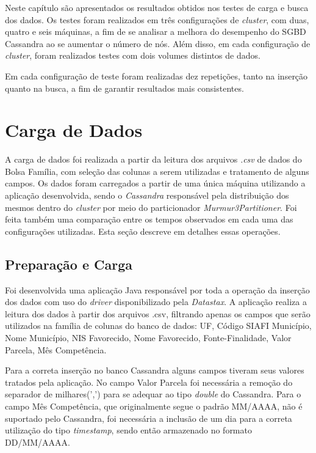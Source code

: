 Neste capítulo são apresentados os resultados obtidos nos testes de carga e busca dos dados. Os testes foram realizados em três configurações de \emph{cluster}, com duas, quatro e seis máquinas, a fim de se analisar a melhora do desempenho do SGBD Cassandra ao se aumentar o número de nós. Além disso, em cada configuração de \emph{cluster}, foram realizados testes com dois volumes distintos de dados.

Em cada configuração de teste foram realizadas dez repetições, tanto na inserção quanto na busca, a fim de garantir resultados mais consistentes. 

\section{Carga de Dados}
A carga de dados foi realizada a partir da leitura dos arquivos \emph{.csv} de dados do Bolsa Família, com seleção das colunas a serem utilizadas e tratamento de alguns campos.
Os dados foram carregados a partir de uma única máquina utilizando a aplicação desenvolvida, sendo o \emph{Cassandra} responsável pela distribuição dos mesmos dentro do \emph{cluster} por meio do particionador \emph{Murmur3Partitioner}. Foi feita também uma comparação entre os tempos observados em cada uma das configurações utilizadas. Esta seção descreve em detalhes essas operações.

\subsection{Preparação e Carga}
Foi desenvolvida uma aplicação Java responsável por toda a operação da inserção dos dados com uso do \emph{driver} disponibilizado pela \emph{Datastax}. A aplicação realiza a leitura dos dados à partir dos arquivos .csv, filtrando apenas os campos que serão utilizados na família de colunas do banco de dados: UF, Código SIAFI Município, Nome Município, NIS Favorecido, Nome Favorecido, Fonte-Finalidade, Valor Parcela, Mês Competência. 

Para a correta inserção no banco Cassandra alguns campos tiveram seus valores tratados pela aplicação. No campo Valor Parcela foi necessária a remoção do separador de milhares(',') para se adequar ao tipo \emph{double} do Cassandra. Para o campo Mês Competência, que originalmente segue o padrão MM/AAAA, não é suportado pelo Cassandra, foi necessária a inclusão de um dia para a correta utilização do tipo \emph{timestamp}, sendo então armazenado no formato DD/MM/AAAA.

